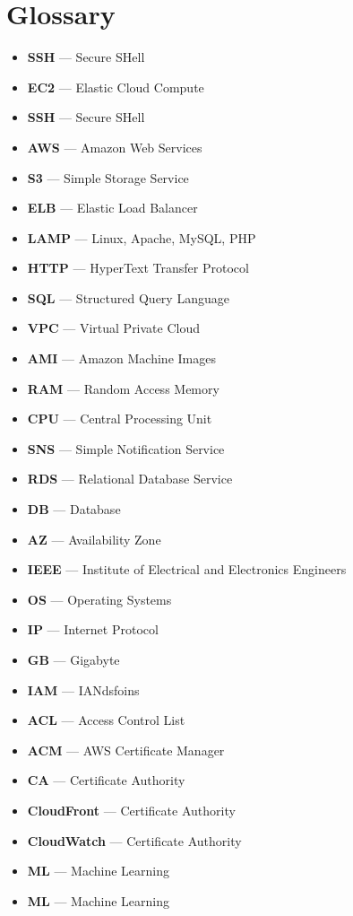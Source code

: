 \chapter{Glossary}

\begin{itemize}
    \item \textbf{SSH} — Secure SHell
    \item  \textbf{EC2} — Elastic Cloud Compute
    \item  \textbf{SSH} — Secure SHell
    \item  \textbf{AWS} — Amazon Web Services
    \item  \textbf{S3} — Simple Storage Service
    \item  \textbf{ELB} — Elastic Load Balancer
    \item  \textbf{LAMP} — Linux, Apache, MySQL, PHP
    \item  \textbf{HTTP} — HyperText Transfer Protocol
    \item  \textbf{SQL} — Structured Query Language
    \item  \textbf{VPC} — Virtual Private Cloud
    \item  \textbf{AMI} — Amazon Machine Images
    \item  \textbf{RAM} — Random Access Memory
    \item  \textbf{CPU} — Central Processing Unit
    \item  \textbf{SNS} — Simple Notification Service
    \item  \textbf{RDS} — Relational Database Service
    \item  \textbf{DB} — Database
    \item  \textbf{AZ} — Availability Zone
    \item  \textbf{IEEE} — Institute of Electrical and Electronics Engineers
    \item \textbf{OS} — Operating Systems
    \item \textbf{IP} — Internet Protocol
    \item \textbf{GB} — Gigabyte
    \item \textbf{IAM} — IANdsfoins
    \item \textbf{ACL} — Access Control List
    \item \textbf{ACM} — AWS Certificate Manager
    \item \textbf{CA} — Certificate Authority
    \item \textbf{CloudFront}  — Certificate Authority
    \item \textbf{CloudWatch} — Certificate Authority
    \item \textbf{ML} — Machine Learning
    \item \textbf{ML} — Machine Learning



\end{itemize}